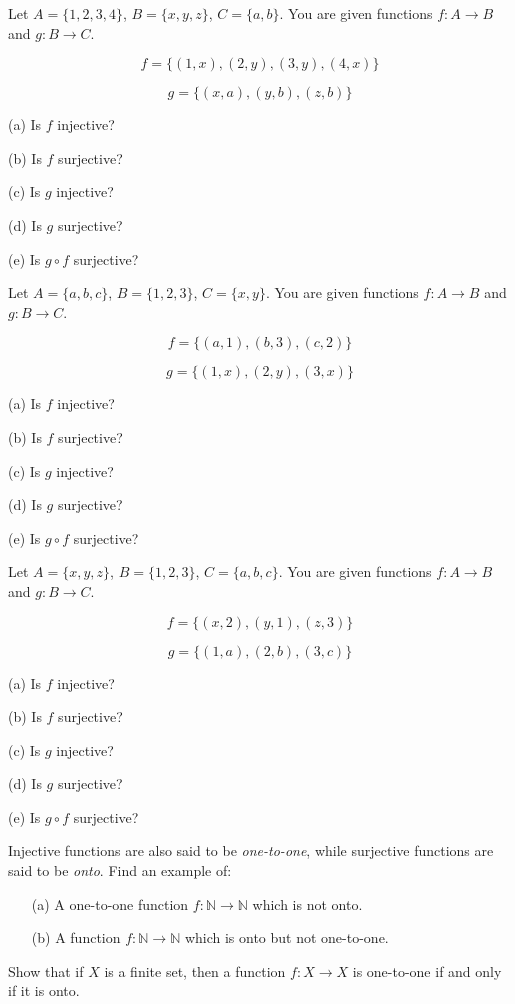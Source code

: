 \documentclass[11pt,paper=b5,footinclude,headinclude]{scrbook} %
\theoremstyle{remark}
\theoremstyle{definition} %
\theoremstyle{theorem} %
\newtheorem{ex}{Exercise\hypertarget{sol:\theex}}[chapter]
\begin{document}
\begin{ex}
 Let $A = \{1,2,3,4\}$, $B = \{x,y,z\}$, $C = \{a,b\}$. You are given functions $f:A\to B$ and $g:B\to C$.

\[ f = \{(1,x),(2,y),(3,y),(4,x)\} \]

\[ g = \{(x,a),(y,b),(z,b)\} \]

(a) Is $f$ injective?

(b) Is $f$ surjective?

(c) Is $g$ injective?

(d) Is $g$ surjective?

(e) Is $g \circ f$ surjective?

\end{ex}
\begin{ex}
 Let $A = \{a,b,c\}$, $B = \{1,2,3\}$, $C = \{x,y\}$. You are given functions $f:A\to B$ and $g:B\to C$.

\[ f = \{(a,1),(b,3),(c,2)\} \]

\[ g = \{(1,x),(2,y),(3,x)\} \]

(a) Is $f$ injective?

(b) Is $f$ surjective?

(c) Is $g$ injective?

(d) Is $g$ surjective?

(e) Is $g \circ f$ surjective?
    
\end{ex}
\begin{ex}
 Let $A = \{x,y,z\}$, $B = \{1,2,3\}$, $C = \{a,b,c\}$. You are given functions $f:A\to B$ and $g:B\to C$.

\[ f = \{(x,2),(y,1),(z,3)\} \]

\[ g = \{(1,a),(2,b),(3,c)\} \]

(a) Is $f$ injective?

(b) Is $f$ surjective?

(c) Is $g$ injective?

(d) Is $g$ surjective?

(e) Is $g \circ f$ surjective?
\end{ex}


\begin{ex}
Injective functions are also said to be \emph{one-to-one}, while surjective functions are said to be \emph{onto}.
Find an example of:
\begin{enumerate}
    \item[(a)] A one-to-one function \( f : \mathbb{N} \to \mathbb{N} \) which is not onto. 
    \item[(b)] A function \( f : \mathbb{N} \to \mathbb{N} \) which is onto but not one-to-one.
\end{enumerate}
\end{ex}
\begin{ex}
Show that if \( X \) is a finite set, then a function \( f : X \to X \) is one-to-one if and only if it is onto.
\end{ex}
\end{document}
